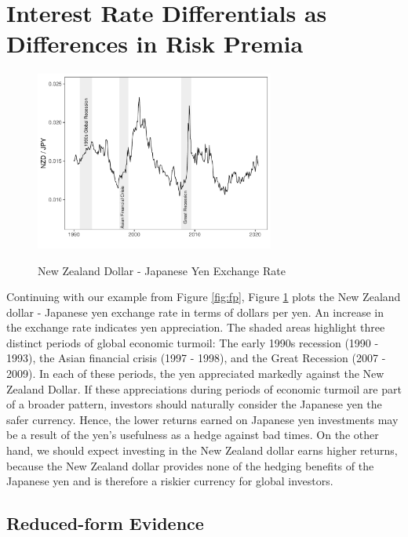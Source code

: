 \section{Interest Rate Differentials as Differences in Risk Premia}

\begin{figure}[htp!]
  \centering
  \caption{New Zealand Dollar - Japanese Yen Exchange Rate}
  \includegraphics[width=0.7\textwidth]{Exhibits/Figure_FX_JPYNZD.pdf}
  \label{fig:spot}
\end{figure}
Continuing with our example from Figure \ref{fig:fp}, Figure
\ref{fig:spot} plots the New Zealand dollar - Japanese yen exchange
rate in terms of dollars per yen. An increase in the exchange rate
indicates yen appreciation. The shaded areas highlight three distinct
periods of global economic turmoil: The early 1990s recession (1990 -
1993), the Asian financial crisis (1997 - 1998), and the Great
Recession (2007 - 2009). In each of these periods, the yen appreciated
markedly against the New Zealand Dollar. If these appreciations during
periods of economic turmoil are part of a broader pattern, investors
should naturally consider the Japanese yen the safer currency. Hence,
the lower returns earned on Japanese yen investments may be a result
of the yen's usefulness as a hedge against bad times. On the other
hand, we should expect investing in the New Zealand dollar earns
higher returns, because the New Zealand dollar provides none of the
hedging benefits of the Japanese yen and is therefore a riskier
currency for global investors.

\subsection{Reduced-form Evidence}

